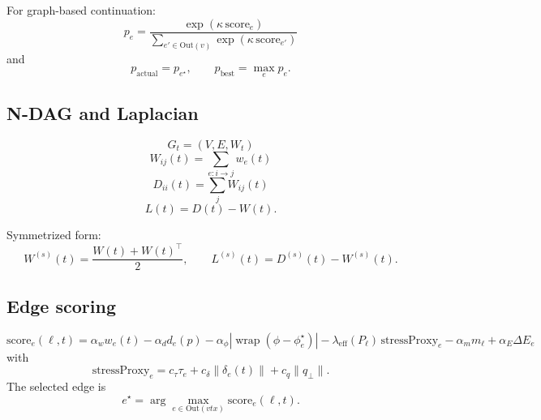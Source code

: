 \documentclass[11pt,a4paper]{article}
\begin{document}
For graph-based continuation:
\begin{equation}
p_e=
\frac{\exp(\kappa\,\mathrm{score}_e)}
{\sum_{e'\in\mathrm{Out}(v)}\exp(\kappa\,\mathrm{score}_{e'})}
\label{eq:softmax_edge}
\end{equation}
and
\begin{equation}
p_{\mathrm{actual}}=p_{e^\star},
\qquad
p_{\mathrm{best}}=\max_e p_e.
\label{eq:p_actual_best}
\end{equation}

\subsection{N-DAG and Laplacian}

\begin{equation}
G_t=(V,E,W_t)
\label{eq:graph}
\end{equation}
\begin{equation}
W_{ij}(t)=\sum_{e:i\to j}w_e(t)
\label{eq:adjacency}
\end{equation}
\begin{equation}
D_{ii}(t)=\sum_j W_{ij}(t)
\label{eq:degree}
\end{equation}
\begin{equation}
L(t)=D(t)-W(t).
\label{eq:laplacian}
\end{equation}

Symmetrized form:
\begin{equation}
W^{(s)}(t)=\frac{W(t)+W(t)^\top}{2},
\qquad
L^{(s)}(t)=D^{(s)}(t)-W^{(s)}(t).
\label{eq:sym_laplacian}
\end{equation}

\subsection{Edge scoring}

\begin{equation}
\mathrm{score}_e(\ell,t)=
\alpha_w w_e(t)
-\alpha_d d_e(p)
-\alpha_\phi |\operatorname{wrap}(\phi-\phi_e^\star)|
-\lambda_{\mathrm{eff}}(P_\ell)\,\mathrm{stressProxy}_e
-\alpha_m m_\ell
+\alpha_E \Delta E_e
\label{eq:edge_score}
\end{equation}
with
\begin{equation}
\mathrm{stressProxy}_e=
c_\tau\tau_e+c_\delta\|\delta_e(t)\|+c_q\|q_\perp\|.
\label{eq:stress_proxy}
\end{equation}
The selected edge is
\begin{equation}
e^\star=\arg\max_{e\in\mathrm{Out}(vtx)}\mathrm{score}_e(\ell,t).
\label{eq:edge_choice}
\end{equation}
\end{document}
